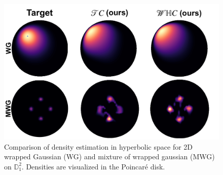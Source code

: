 \begin{figure}[t!]
     \centering
     \includegraphics[width=\linewidth]{hyperbolic_density_graphic.pdf}
     \vspace{-10pt}
     \caption{Comparison of density estimation in hyperbolic space for 2D wrapped Gaussian (WG) and mixture of wrapped gaussian (MWG) on $\mathbb{D}^2_1$. Densities are visualized in the Poincar\'e disk.}
     \vspace{-10pt}
     \label{fig:density_estimation}
 \end{figure}

